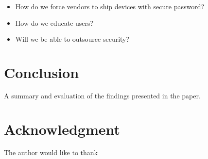 \documentclass[10pt,journal,compsoc]{IEEEtran}
\begin{document}
\begin{itemize}
\item How do we force vendors to ship devices with secure password?
\item How do we educate users?
\item Will we be able to outsource security?
\end{itemize}


\section{Conclusion}
A summary and evaluation of the findings presented in the paper.



\section*{Acknowledgment}
The author would like to thank 


\end{document}
